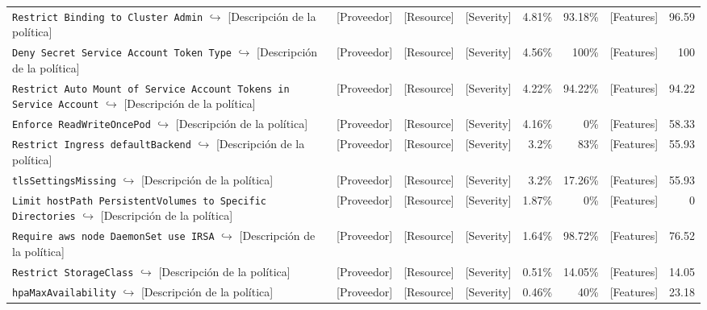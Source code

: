 \begin{table}[ht]
\begin{tabular}{lcccrrrr}
\makecell[l]{\texttt{Restrict Binding to Cluster Admin} \\ $\hookrightarrow$ [Descripción de la política]} & [Proveedor] & [Resource] & [Severity] & 4.81\% & 93.18\% & [Features] & 96.59 \\
\makecell[l]{\texttt{Deny Secret Service Account Token Type} \\ $\hookrightarrow$ [Descripción de la política]} & [Proveedor] & [Resource] & [Severity] & 4.56\% & 100\% & [Features] & 100 \\
\makecell[l]{\texttt{Restrict Auto Mount of Service Account Tokens in Service Account} \\ $\hookrightarrow$ [Descripción de la política]} & [Proveedor] & [Resource] & [Severity] & 4.22\% & 94.22\% & [Features] & 94.22 \\
\makecell[l]{\texttt{Enforce ReadWriteOncePod} \\ $\hookrightarrow$ [Descripción de la política]} & [Proveedor] & [Resource] & [Severity] & 4.16\% & 0\% & [Features] & 58.33 \\
\makecell[l]{\texttt{Restrict Ingress defaultBackend} \\ $\hookrightarrow$ [Descripción de la política]} & [Proveedor] & [Resource] & [Severity] & 3.2\% & 83\% & [Features] & 55.93 \\
\makecell[l]{\texttt{tlsSettingsMissing} \\ $\hookrightarrow$ [Descripción de la política]} & [Proveedor] & [Resource] & [Severity] & 3.2\% & 17.26\% & [Features] & 55.93 \\
\makecell[l]{\texttt{Limit hostPath PersistentVolumes to Specific Directories} \\ $\hookrightarrow$ [Descripción de la política]} & [Proveedor] & [Resource] & [Severity] & 1.87\% & 0\% & [Features] & 0 \\
\makecell[l]{\texttt{Require aws node DaemonSet use IRSA} \\ $\hookrightarrow$ [Descripción de la política]} & [Proveedor] & [Resource] & [Severity] & 1.64\% & 98.72\% & [Features] & 76.52 \\
\makecell[l]{\texttt{Restrict StorageClass} \\ $\hookrightarrow$ [Descripción de la política]} & [Proveedor] & [Resource] & [Severity] & 0.51\% & 14.05\% & [Features] & 14.05 \\
\makecell[l]{\texttt{hpaMaxAvailability} \\ $\hookrightarrow$ [Descripción de la política]} & [Proveedor] & [Resource] & [Severity] & 0.46\% & 40\% & [Features] & 23.18 \\

\end{tabular}
\end{table}

